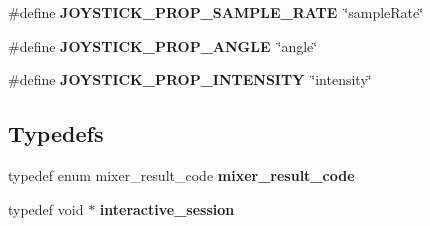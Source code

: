 \begin{DoxyCompactItemize}
\item 
\mbox{\label{group__interactivity_gac38d879ffa1ed03c06b9bd6e389975a1}} 
\#define {\bfseries J\+O\+Y\+S\+T\+I\+C\+K\+\_\+\+P\+R\+O\+P\+\_\+\+S\+A\+M\+P\+L\+E\+\_\+\+R\+A\+TE}~\char`\"{}sample\+Rate\char`\"{}
\item 
\mbox{\label{group__interactivity_ga32fa8936a4e80ab5219c5aab7a43703c}} 
\#define {\bfseries J\+O\+Y\+S\+T\+I\+C\+K\+\_\+\+P\+R\+O\+P\+\_\+\+A\+N\+G\+LE}~\char`\"{}angle\char`\"{}
\item 
\mbox{\label{group__interactivity_ga8a4ad3f70e95bad6429bf17e5eeb214c}} 
\#define {\bfseries J\+O\+Y\+S\+T\+I\+C\+K\+\_\+\+P\+R\+O\+P\+\_\+\+I\+N\+T\+E\+N\+S\+I\+TY}~\char`\"{}intensity\char`\"{}
\end{DoxyCompactItemize}
\subsection*{Typedefs}
\begin{DoxyCompactItemize}
\item 
\mbox{\label{group__interactivity_gacb2d49b6c81314ea0f832210c5904d7d}} 
typedef enum mixer\+\_\+result\+\_\+code {\bfseries mixer\+\_\+result\+\_\+code}
\item 
\mbox{\label{group__interactivity_ga6d8819d38b8dc8994a2299cf22a65a31}} 
typedef void $\ast$ {\bfseries interactive\+\_\+session}
\end{DoxyCompactItemize}

